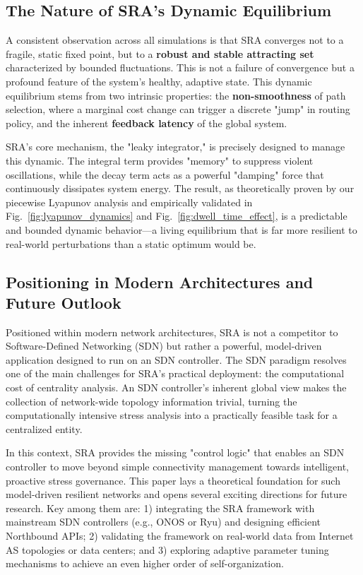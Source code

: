 \documentclass[journal]{IEEEtran}
\begin{document}
\subsection{The Nature of SRA's Dynamic Equilibrium}

A consistent observation across all simulations is that SRA converges not to a fragile, static fixed point, but to a \textbf{robust and stable attracting set} characterized by bounded fluctuations. This is not a failure of convergence but a profound feature of the system's healthy, adaptive state. This dynamic equilibrium stems from two intrinsic properties: the \textbf{non-smoothness} of path selection, where a marginal cost change can trigger a discrete "jump" in routing policy, and the inherent \textbf{feedback latency} of the global system.

SRA's core mechanism, the "leaky integrator," is precisely designed to manage this dynamic. The integral term provides "memory" to suppress violent oscillations, while the decay term acts as a powerful "damping" force that continuously dissipates system energy. The result, as theoretically proven by our piecewise Lyapunov analysis and empirically validated in Fig.~\ref{fig:lyapunov_dynamics} and Fig.~\ref{fig:dwell_time_effect}, is a predictable and bounded dynamic behavior---a living equilibrium that is far more resilient to real-world perturbations than a static optimum would be.

\subsection{Positioning in Modern Architectures and Future Outlook}

Positioned within modern network architectures, SRA is not a competitor to Software-Defined Networking (SDN) but rather a powerful, model-driven application designed to run on an SDN controller. The SDN paradigm resolves one of the main challenges for SRA's practical deployment: the computational cost of centrality analysis. An SDN controller's inherent global view makes the collection of network-wide topology information trivial, turning the computationally intensive stress analysis into a practically feasible task for a centralized entity.

In this context, SRA provides the missing "control logic" that enables an SDN controller to move beyond simple connectivity management towards intelligent, proactive stress governance. This paper lays a theoretical foundation for such model-driven resilient networks and opens several exciting directions for future research. Key among them are: 1) integrating the SRA framework with mainstream SDN controllers (e.g., ONOS or Ryu) and designing efficient Northbound APIs; 2) validating the framework on real-world data from Internet AS topologies or data centers; and 3) exploring adaptive parameter tuning mechanisms to achieve an even higher order of self-organization.
\end{document}
